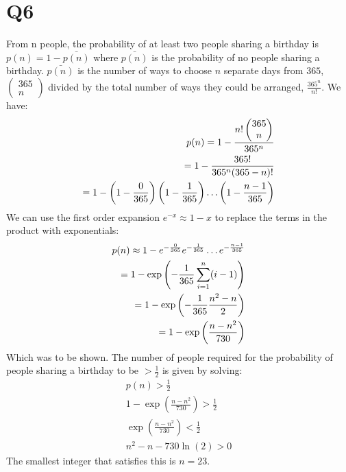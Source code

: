\documentclass[../main.tex]{subfiles}
\begin{document}
\section*{Q6}
From n people, the probability of at least two people sharing a birthday is $p(n)=1-\bar{p(n)}$ where $\bar{p(n)}$ is the probability of no people sharing a birthday. $\bar{p(n)}$ is the number of ways to choose $n$ separate days from $365$, $\left(\begin{matrix}365 \\ n\end{matrix}\right)$ divided by the total number of ways they could be arranged, $\frac{365^n}{n!}$. We have:
\begin{align*}
	p(n) = 1-\frac{n!\left(\begin{matrix}365\\n\end{matrix}\right)}{365^n}\\
	= 1-\frac{365!}{365^n(365-n)!}\\
	=1-\left(1-\frac{0}{365}\right)\left(1-\frac{1}{365}\right)\mathellipsis\left(1-\frac{n-1}{365}\right)
\end{align*}
We can use the first order expansion $e^{-x}\approx 1-x$ to replace the terms in the product with exponentials:
\begin{align}
	p(n)\approx 1-e^{-\frac{0}{365}}e^{-\frac{1}{365}}\mathellipsis e^{-\frac{n-1}{365}}\\
	=1-\exp\left(-\frac{1}{365}\sum_{i=1}^n(i-1)\right)\\
	=1-\exp\left(-\frac{1}{365}\frac{n^2-n}{2}\right)\\
	=1-\exp\left(\frac{n-n^2}{730}\right)
\end{align}
Which was to be shown.
The number of people required for the probability of people sharing a birthday to be $>\frac{1}{2}$ is given by solving:
\begin{align}
	p(n) > \frac{1}{2}\\
	1-\exp\left(\frac{n-n^2}{730}\right)>\frac{1}{2}\\
	\exp\left(\frac{n-n^2}{730}\right)<\frac{1}{2}\\
	n^2-n-730\ln(2)>0
\end{align}
The smallest integer that satisfies this is $n=23$.
\end{document}
